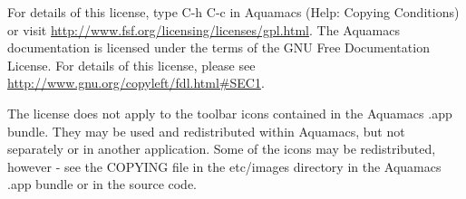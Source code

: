 \documentclass[11pt,letterpaper]{article}
\begin{document}
For details of
this license, type C-h C-c in Aquamacs (Help: Copying Conditions) or
visit \url{http://www.fsf.org/licensing/licenses/gpl.html}. The
Aquamacs documentation is licensed under the terms of the GNU Free
Documentation License. For details of this license, please see
\url{http://www.gnu.org/copyleft/fdl.html#SEC1}.

The license does not apply to the toolbar icons contained in the
Aquamacs .app bundle. They may be used and redistributed within
Aquamacs, but not separately or in another application. Some of the
icons may be redistributed, however - see the COPYING file in the etc/images
directory in the Aquamacs .app bundle or in the source code.



\end{document}
